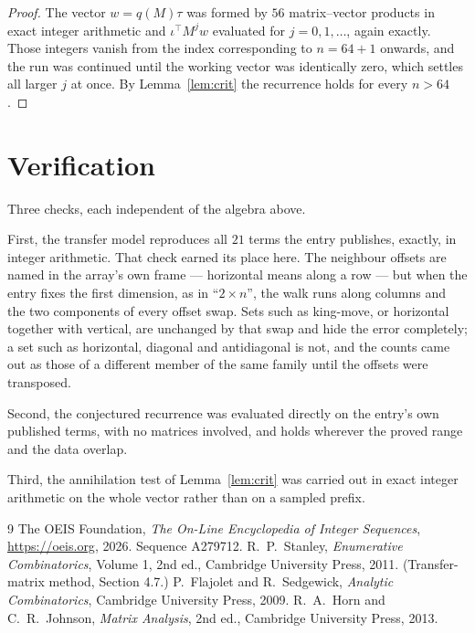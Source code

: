 \documentclass[11pt,a4paper]{article}
\theoremstyle{plain}
\theoremstyle{definition}
\begin{document}
\begin{proof}
The vector $w=q(M)\tau$ was formed by $56$ matrix--vector products in exact integer
arithmetic and $\iota^{\!\top}M^{j}w$ evaluated for $j=0,1,\dots$, again exactly. Those
integers vanish from the index corresponding to $n=64+1$ onwards, and the run was
continued until the working vector was identically zero, which settles all larger $j$ at once.
By Lemma~\ref{lem:crit} the recurrence holds for every $n>64$.
\end{proof}

\section{Verification}

Three checks, each independent of the algebra above.

First, the transfer model reproduces all $21$ terms the entry publishes, exactly, in
integer arithmetic. That check earned its place here. The neighbour offsets are named in the
array's own frame --- horizontal means along a row --- but when the entry fixes the first
dimension, as in ``$2\times n$'', the walk runs along columns and the two components of every
offset swap. Sets such as king-move, or horizontal together with vertical, are unchanged by
that swap and hide the error completely; a set such as horizontal, diagonal and antidiagonal
is not, and the counts came out as those of a different member of the same family until the
offsets were transposed.

Second, the conjectured recurrence was evaluated directly on the entry's own published terms,
with no matrices involved, and holds wherever the proved range and the data overlap.

Third, the annihilation test of Lemma~\ref{lem:crit} was carried out in exact integer
arithmetic on the whole vector rather than on a sampled prefix.

\begin{thebibliography}{9}
 The OEIS Foundation, \emph{The On-Line Encyclopedia of Integer
Sequences}, \url{https://oeis.org}, 2026. Sequence A279712.
 R.~P.~Stanley, \emph{Enumerative Combinatorics}, Volume 1, 2nd ed.,
Cambridge University Press, 2011. (Transfer-matrix method, Section 4.7.)
 P.~Flajolet and R.~Sedgewick, \emph{Analytic Combinatorics}, Cambridge
University Press, 2009.
 R.~A.~Horn and C.~R.~Johnson, \emph{Matrix Analysis}, 2nd ed., Cambridge
University Press, 2013.
\end{thebibliography}
\end{document}
